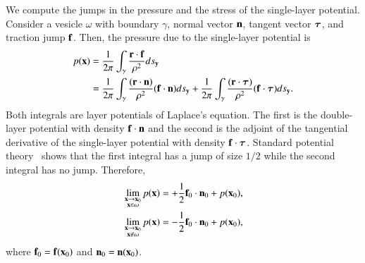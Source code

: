 We compute the jumps in the pressure and the stress of the single-layer potential.  Consider a vesicle $\omega$ with boundary $\gamma$, normal vector ${\mathbf{n}}$, tangent vector ${\boldsymbol\tau}$, and traction jump ${\mathbf{f}}$.  Then, the pressure due to the single-layer potential is 
\begin{align*}
  p({\mathbf{x}}) &= \frac{1}{2\pi}\int_{\gamma} 
    \frac{{\mathbf{r}} \cdot {\mathbf{f}}}{\rho^{2}}ds_{{\mathbf{y}}} \\
  &= \frac{1}{2\pi}\int_{\gamma} 
    \frac{({\mathbf{r}} \cdot {\mathbf{n}})}{\rho^{2}}({\mathbf{f}} \cdot {\mathbf{n}}) ds_{{\mathbf{y}}} + 
    \frac{1}{2\pi}\int_{\gamma} 
    \frac{({\mathbf{r}} \cdot {\boldsymbol\tau})}{\rho^{2}}({\mathbf{f}} \cdot {\boldsymbol\tau}) ds_{{\mathbf{y}}}.
\end{align*}
Both integrals are layer potentials of Laplace's equation.  The first is
the double-layer potential with density ${\mathbf{f}} \cdot {\mathbf{n}}$ and the second
is the adjoint of the tangential derivative of the single-layer
potential with density ${\mathbf{f}} \cdot {\boldsymbol\tau}$.  Standard potential
theory~\cite{kellogg} shows that the first integral has a jump of size
$1/2$ while the second integral has no jump.  Therefore, 
\begin{align*}
  &\lim_{\substack{{\mathbf{x}} \rightarrow {\mathbf{x}}_{0} \\ {\mathbf{x}} \in \omega}}p({\mathbf{x}}) = 
  +\frac{1}{2}{\mathbf{f}}_{0} \cdot {\mathbf{n}}_{0} + p({\mathbf{x}}_{0}), \\
  &\lim_{\substack{{\mathbf{x}} \rightarrow {\mathbf{x}}_{0} \\ {\mathbf{x}} \notin \omega}}p({\mathbf{x}}) = 
  -\frac{1}{2}{\mathbf{f}}_{0} \cdot {\mathbf{n}}_{0} + p({\mathbf{x}}_{0}),
\end{align*}
where ${\mathbf{f}}_{0} = {\mathbf{f}}({\mathbf{x}}_{0})$ and ${\mathbf{n}}_{0} = {\mathbf{n}}({\mathbf{x}}_{0})$.

